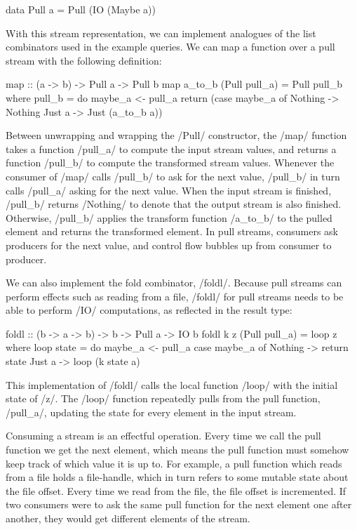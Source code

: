 \begin{haskell}
data Pull a = Pull (IO (Maybe a))
\end{haskell}

With this stream representation, we can implement analogues of the list combinators used in the example queries.
We can map a function over a pull stream with the following definition:

\begin{haskell}
map :: (a -> b) -> Pull a -> Pull b
map a_to_b (Pull pull_a) = Pull pull_b
 where
  pull_b = do
    maybe_a <- pull_a
    return (case maybe_a of
             Nothing -> Nothing
             Just a  -> Just (a_to_b a))
\end{haskell}

Between unwrapping and wrapping the \Hs/Pull/ constructor, the \Hs/map/ function takes a function \Hs/pull_a/ to compute the input stream values, and returns a function \Hs/pull_b/ to compute the transformed stream values.
Whenever the consumer of \Hs/map/ calls \Hs/pull_b/ to ask for the next value, \Hs/pull_b/ in turn calls \Hs/pull_a/ asking for the next value.
When the input stream is finished, \Hs/pull_b/ returns \Hs/Nothing/ to denote that the output stream is also finished.
Otherwise, \Hs/pull_b/ applies the transform function \Hs/a_to_b/ to the pulled element and returns the transformed element.
In pull streams, consumers ask producers for the next value, and control flow bubbles up from consumer to producer.

We can also implement the fold combinator, \Hs/foldl/.
Because pull streams can perform effects such as reading from a file, \Hs/foldl/ for pull streams needs to be able to perform \Hs/IO/ computations, as reflected in the result type:

\begin{haskell}
foldl :: (b -> a -> b) -> b -> Pull a -> IO b
foldl k z (Pull pull_a) = loop z
 where
  loop state = do
    maybe_a <- pull_a
    case maybe_a of
      Nothing -> return state
      Just a -> loop (k state a)
\end{haskell}

This implementation of \Hs/foldl/ calls the local function \Hs/loop/ with the initial state of \Hs/z/.
The \Hs/loop/ function repeatedly pulls from the pull function, \Hs/pull_a/, updating the state for every element in the input stream.

Consuming a stream is an effectful operation.
Every time we call the pull function we get the next element, which means the pull function must somehow keep track of which value it is up to.
For example, a pull function which reads from a file holds a file-handle, which in turn refers to some mutable state about the file offset.
Every time we read from the file, the file offset is incremented.
If two consumers were to ask the same pull function for the next element one after another, they would get different elements of the stream.


